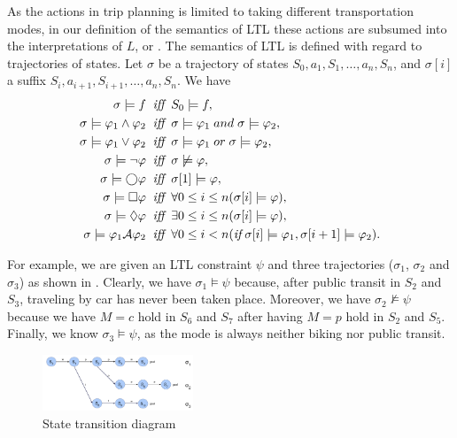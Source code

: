 As the actions in trip planning is limited to taking different transportation modes,
in our definition of the semantics of LTL
these actions are subsumed into the interpretations of $L$, or .
The semantics of LTL is defined with regard to trajectories of states. 
Let $\sigma$ be a trajectory of states $S_0,a_1,S_1,\ldots,a_n,S_n$, and
$\sigma[i]$ a suffix $S_i, a_{i+1}, S_{i+1}, \ldots,a_n,S_n$.  We have
\begin{align*}
	\sigma \models f \;\; &\textit{iff} \;\; S_0 \models f,\\
	\sigma \models \varphi_1 \land \varphi_2 \;\; &\textit{iff} \;\; \sigma \models \varphi_1 \; and \; \sigma \models \varphi_2,\\
	\sigma \models \varphi_1 \lor \varphi_2 \;\; &\textit{iff} \;\; \sigma \models \varphi_1 \; or \; \sigma \models \varphi_2,\\
	\sigma \models \neg \varphi \;\; &\textit{iff} \;\; \sigma \not \models \varphi,\\
	\sigma \models \bigcirc \varphi \;\; &\textit{iff} \;\; \sigma[1] \models \varphi,\\
	\sigma \models \Box \varphi \;\; &\textit{iff} \;\; \forall 0 \leq i \leq n (\sigma[i] \models \varphi),\\
	\sigma \models \Diamond \varphi \;\; &\textit{iff} \;\; \exists 0 \leq i \leq n (\sigma[i] \models \varphi),\\
	\sigma \models \varphi_1 \mathcal{A} \varphi_2 \;\; &\textit{iff} \;\; \forall 0 \leq i < n (\textit{if} \; \sigma[i] \models \varphi_1, \sigma[i+1] \models \varphi_2).
\end{align*}

For example, we are given an LTL constraint $\psi$ and three trajectories ($\sigma_1$, $\sigma_2$ and $\sigma_3$)
as shown in .
Clearly, we have $\sigma_1 \models \psi$ because, after public transit in $S_2$ and $S_3$, 
traveling by car has never been taken place.
Moreover, we have $\sigma_2 \not \models \psi$ because we have $M=c$ hold in $S_6$ and $S_7$
after having $M=p$ hold in $S_2$ and $S_5$.
Finally, we know $\sigma_3 \models \psi$, as the mode is always neither biking nor public transit.

\begin{figure}[!ht]
  \centering
    \includegraphics[width=0.4\textwidth]{figs/trajectories.pdf}
  \caption{State transition diagram\label{fig:trjs}}
\end{figure}


